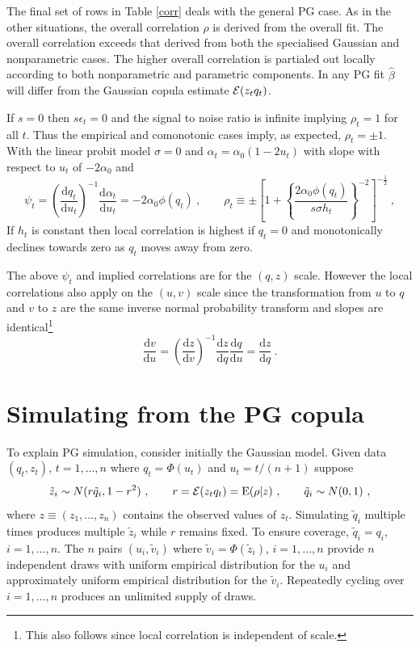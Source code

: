 \documentclass[authoryear]{elsarticle}
\newcommand{\E}{\mathrm{E}}
\newcommand{\eps}{\epsilon}
\newcommand{\Ex}{{\cal E}}
\newcommand{\de}{\mathrm{d}}
\newcommand{\tref}[1]{Table \ref{#1}}
\newcommand{\cq}{\ , \qquad}
\newcommand{\be}[1]{\begin{equation}\label{#1}}
\newcommand{\ee}{\end{equation}}
\begin{document}
The final set of rows in \tref{corr} deals with the general PG case.   As in the other situations, the overall correlation $\rho$ is derived from the overall fit.   The overall correlation exceeds that derived from both the specialised Gaussian and nonparametric cases.   The higher overall correlation is partialed out locally according to both nonparametric and parametric components.   In any PG fit $\hat\beta$ will differ from the Gaussian copula estimate $\Ex(z_tq_t)$.  

If $s=0$ then $s\eps_t=0$  and  the signal to noise ratio is infinite implying $\rho_t=1$ for all $t$.  Thus the empirical and comonotonic cases imply, as expected,  $\rho_t=\pm 1$.   With the linear probit model $\sigma=0$ and $\alpha_t=\alpha_0(1-2u_t)$ with slope with respect to $u_t$ of $-2\alpha_0$ and
\be{normslope2}
\psi_t =  \left( \frac{\de q_t}{\de u_t}\right)^{-1}\frac{\de \alpha_t}{\de u_t}  =
 -2\alpha_0\phi(q_t)\cq  \rho_t\equiv\pm\left[1+\left\{\frac{2\alpha_0\phi(q_t)}{s\sigma h_t}\right\}^{-2}\right]^{-\frac{1}{2}}\ ,
\ee
If $h_t$ is constant then  local correlation is  highest if  $q_t=0$ and monotonically declines towards zero as $q_t$ moves away from zero. 

The above $\psi_t$ and implied correlations are for the $(q,z)$ scale.  However the local correlations also apply on the $(u,v)$ scale since the transformation from $u$ to $q$ and $v$ to $z$ are the same inverse normal probability transform and slopes are identical\footnote{This also follows since local correlation is independent of scale.}
$$
\frac{\de v}{\de u} =\left(\frac{\de z}{\de v}\right)^{-1} \frac{\de z}{\de q} \frac{\de q}{\de u} = \frac{\de z}{\de q}\ .
$$ 
\section{Simulating from the PG copula} 

To explain PG simulation, consider initially  the Gaussian model.   Given data $(q_t,z_t)$, $t=1,\ldots,n$ where
$q_t=\Phi(u_t)$ and $u_t=t/(n+1)$ suppose 
\be{rhohat}
\tilde z_i\sim N(r \tilde q_i,1-r^2)\cq r=\Ex(z_tq_t) = \E(\rho|  z)\cq \tilde q_i\sim N(0,1)\ ,
\ee
where $z\equiv(z_1,\ldots,z_n)$ contains the observed values of $z_t$.
Simulating $\tilde q_i$ multiple times produces multiple $\tilde z_i$ while $r$  remains fixed.   To ensure  coverage, $\tilde q_i=q_i$,  $i=1,\ldots, n$.   The  $n$ pairs $(u_i, \tilde v_i)$ where $\tilde v_i=\Phi(\tilde z_i)$, $i=1,\ldots,n$  provide $n$ independent draws with   uniform  empirical distribution for the $u_i$ and approximately uniform empirical distribution for the $\tilde v_i$.   Repeatedly cycling over $i=1,\ldots,n$  produces an unlimited supply of  draws.
\end{document}

